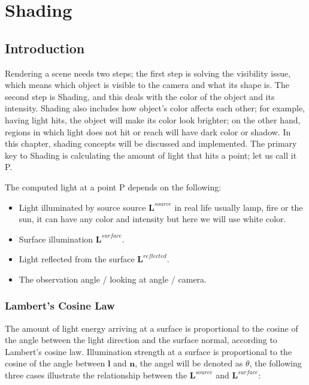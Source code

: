 \documentclass{article}
\begin{document}
	
	\clearpage
	
	
	
	
	\section{Shading}
	\subsection{Introduction}
	
	Rendering a scene needs two steps; the first step is solving the visibility issue, which means which object is visible to the camera and what its shape is. The second step is Shading, and this deals with the color of the object and its intensity. Shading also includes how object's color affects each other; for example, having light hits, the object will make its color look brighter; on the other hand, regions in which light does not hit or reach will have dark color or shadow. In this chapter, shading concepts will be discussed and implemented.  The primary key to Shading is calculating the amount of light that hits a point; let us call it P. 
	
	The computed light at a point P depends on the following: 
	
	\begin{itemize}
		\item Light illuminated by source source  $\pmb{L}^{source}$  in real life usually lamp, fire or the sun, it can have any color and intensity but here we will use white color. 
		\item Surface illumination $\pmb{L}^{surface}$.
		\item Light reflected from the surface $\pmb{L}^{reflected}$.
		\item The observation angle / looking at angle / camera. 
	\end{itemize}
	
	
	
	
	\subsubsection{Lambert's Cosine Law}
	The amount of light energy arriving at a surface is proportional to the cosine of the angle between the light direction and the surface normal, according to Lambert's cosine law. Illumination strength at a surface is proportional to the cosine of the angle between $\pmb{l}$ and $\pmb{n}$, the angel will be denoted as $\theta$, the following three cases illustrate the relationship between the  $\pmb{L}^{source}$ and  $\pmb{L}^{surface}$:
	
\end{document}

